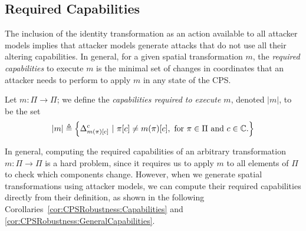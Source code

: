 {%

\subsection{Required Capabilities}
\label{sec:CPSRobustness:AttackerCapabilities}
The inclusion of the identity transformation as an action available to all attacker models implies that attacker models generate attacks that do not use all their altering {capabilities}. In general, for a given spatial transformation ${m}$, the \emph{required capabilities} to execute ${m}$ is the minimal set of changes in coordinates that an attacker needs to perform to apply ${m}$ in any state of the CPS. 

\begin{definition}
Let ${m}\colon \Pi\rightarrow \Pi$; we define the \emph{capabilities required to execute $m$}, denoted $|m|$, to be the set  
\begin{align}
  |m|\triangleq \left\{{\Delta}^c_{m(\pi)[c]}\ |\ \pi[c]\neq m(\pi)[c],\text{ for $\pi\in\Pi$ and $c\in \mathbb{C}$.}\right\}
\end{align}
\end{definition}

In general, computing the required capabilities of an arbitrary transformation $m\colon \Pi\rightarrow\Pi$ is a hard problem, since it requires us to apply $m$ to all elements of $\Pi$ to check which components change. However, when we generate spatial transformations using attacker models, we can compute their required capabilities directly from their definition, as shown in the following Corollaries~\ref{cor:CPSRobustness:Capabilities} and \ref{cor:CPSRobustness:GeneralCapabilities}. 

}
